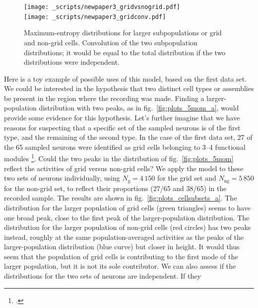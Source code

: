 \documentclass[\ifafour a4paper,12pt,\else a5paper,10pt,\fi%
onecolumn,oneside,article,%
british%
]{memoir}
\theoremstyle{remark}
\theoremstyle{innote}
\newcommand*{\citep}{\footcites}
\renewcommand*{\|}{\nonscript\,\vert\nonscript\;\mathopen{}}
\newcommand*{\fig}{fig.}%
\newcommand*{\yNg}{N_{\text{g}}}
\newcommand*{\yNng}{N_{\text{ng}}}
\begin{document}
\begin{figure}[!p]
\centering
\subcaption[]{\label{fig:plots_cellsubsets_a}}%
\texttt{[image: \_scripts/newpaper3\_gridvsnogrid.pdf]}%
\\[2em]%
\subcaption[]{\label{fig:plots_cellsubsets_b}}%
\texttt{[image: \_scripts/newpaper3\_gridconv.pdf]}%
\\[2em]%
\caption{ Maximum-entropy
  distributions for larger subpopulations or grid and non-grid cells.
   Convolution of the two
  subpopulation distributions; it would be equal to the total distribution
  if the two distributions were independent.}
\label{fig:plots_cellsubsets}
\end{figure}
Here is a toy example of possible uses of this model,
based on the first data set. We could be interested in the hypothesis that
two distinct cell types or assemblies be present in the region where the
recording was made. Finding a larger-population distribution with two
peaks, as in \fig~\ref{fig:plots_5mom_a}, would provide
some evidence for this hypothesis. Let's further imagine that we have
reasons for suspecting that a specific set of the sampled neurons is of the
first type, and the remaining of the second type. In the case of the first
data set, 27 of the 65 sampled neurons were identified as grid cells
belonging to 3--4 functional modules \citep{dunnetal2015}. Could the
two peaks in the distribution of \fig~\ref{fig:plots_5mom} reflect the
activities of grid versus non-grid cells? We apply the model to these two
sets of neurons individually, using $\yNg=4\,150$ for the grid set and
$\yNng=5\,850$ for the non-grid set, to reflect their proportions (27/65
and 38/65) in the recorded sample. The results are shown in 
 \fig~\ref{fig:plots_cellsubsets_a}. The distribution for the larger
population of grid cells (\textcolor{mygreen}{green triangles}) seems to
have one broad peak, close to the first peak of the larger-population
distribution. The distribution for the larger population of non-grid cells
(\textcolor{myred}{red circles}) has two peaks instead, roughly at the same
population-averaged activities as the peaks of the larger-population distribution
(\textcolor{myblue}{blue curve}) but closer in height. It would thus seem
that the population of grid cells is contributing to the first mode of the
larger population, but it is not its sole contributor. We can also assess
if the distributions for the two sets of neurons are independent. If they
\end{document}

